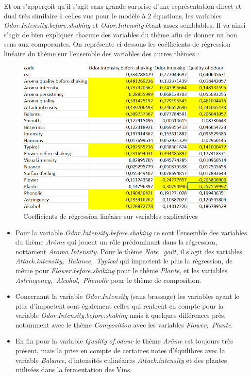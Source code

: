\documentclass[a4paper,french,10pt]{article}
\begin{document}
Et on s'apperçoit qu'il s'agit sans grande surprise d'une représentation direct et dual très similaire à celles vue pour le modèle à 2 équations, les variables \textit{Odor.Intensity.before.shaking} et \textit{Odor.Intensity} étant assez semblables. Il va ainsi s'agir de bien expliquer chacune des variables du thème afin de donner un bon sens aux composantes. \newline 
On représente ci-dessous les coéfficients de régression linéaire du thème sur l'ensemble des variables des autres thèmes : 

\begin{figure}[htp] 
	\centering
	\includegraphics[scale=0.45]{images/Coeff_var_Cross.png}
	\caption{Coefficients de régression linéaire sur variables explicatives}
\end{figure}

\begin{itemize}
	\item Pour la variable \textit{Odor.Intensity.before.shaking} ce sont l'ensemble des variables du thème \textit{Arôme} qui jouent un rôle prédominant dans la régression, nottament \textit{Aroma.Intensity}. Pour le thème \textit{Note\_goût}, il s'agit des variables \textit{Attack.intensity,~Balance,~Typical} qui impactent le plus la régression, de même pour \textit{Flower.before.shaking} pour le thème \textit{Plante}, et les variables \textit{Astringency,~Alcohol,~Phenolic} pour le thème de composition. 
	\item Concernant la variable \textit{Odor.Intensity} (sans brassage) les variables ayant le plus d'impactent sont également celles qui rentrent en compte pour la variable \textit{Odor.Intensity.before.shaking} mais à quelques différences près, notamment avec le thème \textit{Composition} avec les variables \textit{Flower,~Plante}.
	\item En fin pour la variable \textit{Quality.of.odour} le thème \textit{Arôme} est toujours très présent, mais la prise en compte de certaines notes d'équilibres avec la variable \textit{Balance}, d'intensités culinéaires \textit{Attack.intensity} et des plantes utilisées dans la fermentation des Vins. 
\end{itemize}
\end{document}

